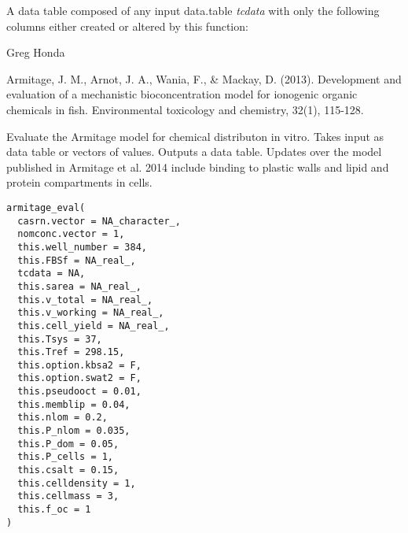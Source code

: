 \documentclass[a4paper]{book}
\begin{document}
%
\begin{Value}
A data table composed of any input data.table \emph{tcdata}
with only the following columns either created or altered by this function:  

\end{Value}
%
\begin{Author}\relax
Greg Honda
\end{Author}
%
\begin{References}\relax
Armitage, J. M., Arnot, J. A., Wania, F., \& Mackay, D. (2013). Development 
and evaluation of a mechanistic bioconcentration model for ionogenic organic 
chemicals in fish. Environmental toxicology and chemistry, 32(1), 115-128.
\end{References}
%
\begin{Description}\relax
Evaluate the Armitage model for chemical distributon in vitro. Takes input
as data table or vectors of values. Outputs a data table. Updates over
the model published in Armitage et al. 2014 include binding to plastic walls
and lipid and protein compartments in cells.
\end{Description}
%
\begin{Usage}
\begin{verbatim}
armitage_eval(
  casrn.vector = NA_character_,
  nomconc.vector = 1,
  this.well_number = 384,
  this.FBSf = NA_real_,
  tcdata = NA,
  this.sarea = NA_real_,
  this.v_total = NA_real_,
  this.v_working = NA_real_,
  this.cell_yield = NA_real_,
  this.Tsys = 37,
  this.Tref = 298.15,
  this.option.kbsa2 = F,
  this.option.swat2 = F,
  this.pseudooct = 0.01,
  this.memblip = 0.04,
  this.nlom = 0.2,
  this.P_nlom = 0.035,
  this.P_dom = 0.05,
  this.P_cells = 1,
  this.csalt = 0.15,
  this.celldensity = 1,
  this.cellmass = 3,
  this.f_oc = 1
)
\end{verbatim}
\end{Usage}
\end{document}
